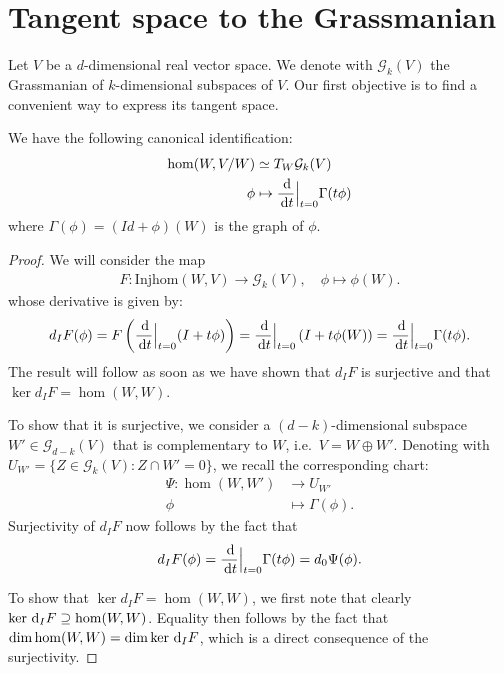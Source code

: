 \documentclass{report}
\begin{document}
\chapter{Tangent space to the Grassmanian}
Let $V$ be a $d$-dimensional real vector space. 
We denote with $\mathcal G_{k}(V)$ the Grassmanian of $k$-dimensional subspaces of $V$.
Our first objective is to find a convenient way to express its tangent space.
\begin{proposition}
We have the following canonical identification:
\begin{align*}
    \hom(W, V/W) &\simeq T_W \mathcal G_{k}(V)\\
    \phi &\mapsto \frac{\,\mathrm{d}}{\,\mathrm{d} t} \Big|_{t=0} \Gamma(t \phi)
\end{align*}
where $\Gamma(\phi) = (Id+\phi)(W)$ is the graph of $\phi$.
\end{proposition}
\begin{proof}
    We will consider the map
    \begin{align*}
        F: \mathrm{Injhom}(W, V) \to \mathcal G_{k}(V), \quad \phi \mapsto \phi(W).
    \end{align*}
    whose derivative is given by:
    \begin{align*}
        d_I F (\phi) = F \left(\frac{\,\mathrm{d}}{\,\mathrm{d} t} \Big|_{t=0} (I + t\phi)\right)
        = \frac{\,\mathrm{d}}{\,\mathrm{d} t} \Big|_{t=0}  \left( I + t\phi (W) \right)
        = \frac{\,\mathrm{d}}{\,\mathrm{d} t} \Big|_{t=0}  \Gamma(t \phi).
    \end{align*}
    The result will follow as soon as we have shown that $d_I F$ is surjective and that $\ker d_I F = \hom(W, W)$.
    
    To show that it is surjective, we consider a $(d-k)$-dimensional subspace $W' \in \mathcal G_{d-k}(V) $ that is complementary to $W$, i.e.\ $V = W \oplus W'$.
    Denoting with $U_{W'} = \{ Z \in \mathcal G_k (V): Z \cap W' = 0 \}$, we recall the corresponding chart:
    \begin{align*}
        \Psi: \hom(W, W') &\to U_{W'}\\
        \phi &\mapsto \Gamma(\phi).
    \end{align*}
    Surjectivity of $d_I F$ now follows by the fact that
    \[
        d_I F(\phi) = \frac{\,\mathrm{d}}{\,\mathrm{d} t} \Big|_{t=0} \Gamma(t \phi) = d_0 \Psi(\phi).
    \]

    To show that $\ker d_I F = \hom(W, W)$, we first note that clearly $\ker \,\mathrm{d}_I F \supseteq \hom(W, W)$.
    Equality then follows by the fact that $\dim \hom(W, W) = \dim \ker \,\mathrm{d}_I F$, which is a direct consequence of the surjectivity.
\end{proof}
\end{document}
